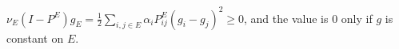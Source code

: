 $\nu_E(I - P^E)g_E = \frac{1}{2} \sum_{i,j \in E} \alpha_i P_{ij}^E(g_i - g_j)^2 \geq 0$, and the value is $0$ only if $g$ is constant on $E$.
